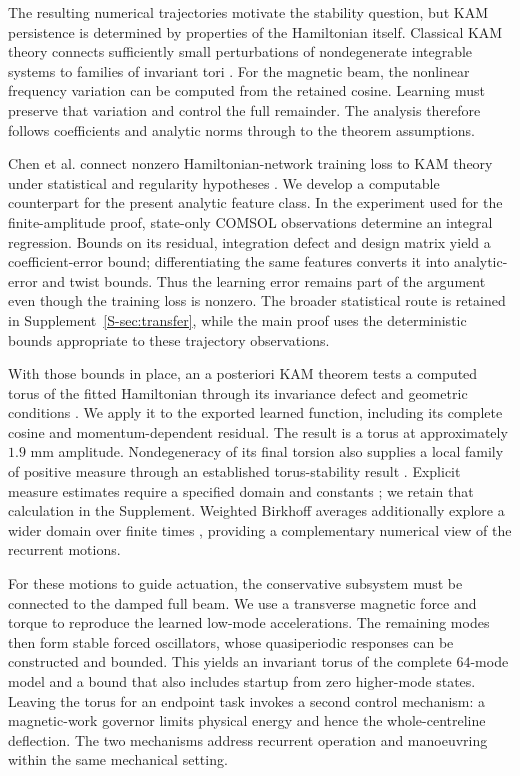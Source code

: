 The resulting numerical trajectories motivate the stability question, but KAM persistence is determined by properties of the Hamiltonian itself. Classical KAM theory connects sufficiently small perturbations of nondegenerate integrable systems to families of invariant tori \citep{poschel,bounemoura}. For the magnetic beam, the nonlinear frequency variation can be computed from the retained cosine. Learning must preserve that variation and control the full remainder. The analysis therefore follows coefficients and analytic norms through to the theorem assumptions.

Chen et al. connect nonzero Hamiltonian-network training loss to KAM theory under statistical and regularity hypotheses \citep{chen2022}. We develop a computable counterpart for the present analytic feature class. In the experiment used for the finite-amplitude proof, state-only COMSOL observations determine an integral regression. Bounds on its residual, integration defect and design matrix yield a coefficient-error bound; differentiating the same features converts it into analytic-error and twist bounds. Thus the learning error remains part of the argument even though the training loss is nonzero. The broader statistical route is retained in Supplement~\ref{S-sec:transfer}, while the main proof uses the deterministic bounds appropriate to these trajectory observations.

With those bounds in place, an a posteriori KAM theorem tests a computed torus of the fitted Hamiltonian through its invariance defect and geometric conditions \citep{haro2019aposteriori}. We apply it to the exported learned function, including its complete cosine and momentum-dependent residual. The result is a torus at approximately $1.9$ mm amplitude. Nondegeneracy of its final torsion also supplies a local family of positive measure through an established torus-stability result \citep{bounemoura2016torus}. Explicit measure estimates require a specified domain and constants \citep{biasco2018measure,chierchia2021measure}; we retain that calculation in the Supplement. Weighted Birkhoff averages additionally explore a wider domain over finite times \citep{das2017quasiperiodicity,duignan2023flows}, providing a complementary numerical view of the recurrent motions.

For these motions to guide actuation, the conservative subsystem must be connected to the damped full beam. We use a transverse magnetic force and torque to reproduce the learned low-mode accelerations. The remaining modes then form stable forced oscillators, whose quasiperiodic responses can be constructed and bounded. This yields an invariant torus of the complete $64$-mode model and a bound that also includes startup from zero higher-mode states. Leaving the torus for an endpoint task invokes a second control mechanism: a magnetic-work governor limits physical energy and hence the whole-centreline deflection. The two mechanisms address recurrent operation and manoeuvring within the same mechanical setting.

